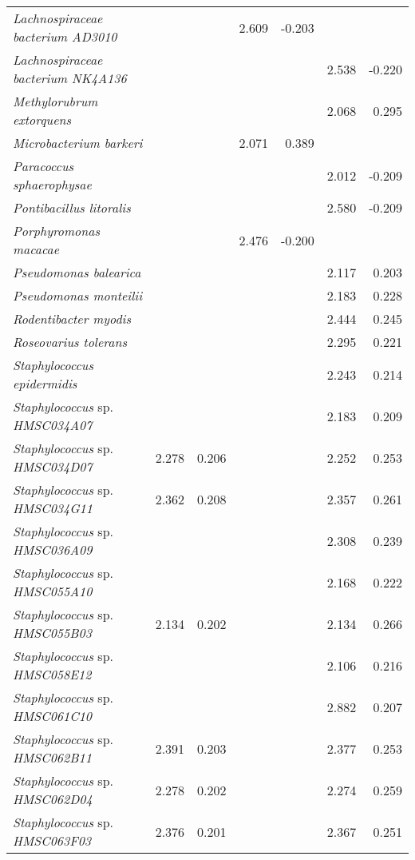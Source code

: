\begin{longtable}{l|rr|rr|rr}
\textit{Lachnospiraceae bacterium AD3010} &  &  & 2.609 & -0.203 &  &  \\
\textit{Lachnospiraceae bacterium NK4A136} &  &  &  &  & 2.538 & -0.220 \\
\textit{Methylorubrum extorquens} &  &  &  &  & 2.068 & 0.295 \\
\textit{Microbacterium barkeri} &  &  & 2.071 & 0.389 &  &  \\
\textit{Paracoccus sphaerophysae} &  &  &  &  & 2.012 & -0.209 \\
\textit{Pontibacillus litoralis} &  &  &  &  & 2.580 & -0.209 \\
\textit{Porphyromonas macacae} &  &  & 2.476 & -0.200 &  &  \\
\textit{Pseudomonas balearica} &  &  &  &  & 2.117 & 0.203 \\
\textit{Pseudomonas monteilii} &  &  &  &  & 2.183 & 0.228 \\
\textit{Rodentibacter myodis} &  &  &  &  & 2.444 & 0.245 \\
\textit{Roseovarius tolerans} &  &  &  &  & 2.295 & 0.221 \\
\textit{Staphylococcus epidermidis} &  &  &  &  & 2.243 & 0.214 \\
\textit{Staphylococcus} sp. \textit{HMSC034A07} &  &  &  &  & 2.183 & 0.209 \\
\textit{Staphylococcus} sp. \textit{HMSC034D07} & 2.278 & 0.206 &  &  & 2.252 & 0.253 \\
\textit{Staphylococcus} sp. \textit{HMSC034G11} & 2.362 & 0.208 &  &  & 2.357 & 0.261 \\
\textit{Staphylococcus} sp. \textit{HMSC036A09} &  &  &  &  & 2.308 & 0.239 \\
\textit{Staphylococcus} sp. \textit{HMSC055A10} &  &  &  &  & 2.168 & 0.222 \\
\textit{Staphylococcus} sp. \textit{HMSC055B03} & 2.134 & 0.202 &  &  & 2.134 & 0.266 \\
\textit{Staphylococcus} sp. \textit{HMSC058E12} &  &  &  &  & 2.106 & 0.216 \\
\textit{Staphylococcus} sp. \textit{HMSC061C10} &  &  &  &  & 2.882 & 0.207 \\
\textit{Staphylococcus} sp. \textit{HMSC062B11} & 2.391 & 0.203 &  &  & 2.377 & 0.253 \\
\textit{Staphylococcus} sp. \textit{HMSC062D04} & 2.278 & 0.202 &  &  & 2.274 & 0.259 \\
\textit{Staphylococcus} sp. \textit{HMSC063F03} & 2.376 & 0.201 &  &  & 2.367 & 0.251 \\

\end{longtable}
